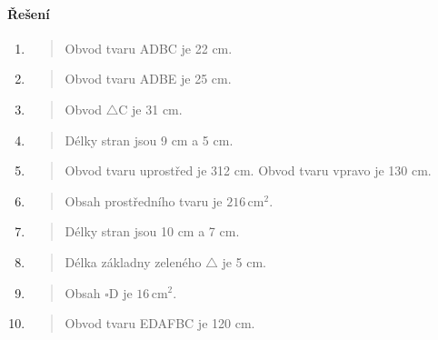 \paragraph{Řešení}
\begin{enumerate}
    \item
    \begin{quote}
        Obvod tvaru ADBC je 22 cm.
    \end{quote}

    \item
    \begin{quote}
        Obvod tvaru ADBE je 25 cm.
    \end{quote}

    \item
    \begin{quote}
        Obvod $\triangle$C je 31 cm.
    \end{quote}

    \item
    \begin{quote}
        Délky stran jsou 9 cm a 5 cm.
    \end{quote}

    \item
    \begin{quote}
        Obvod tvaru uprostřed je 312 cm.
        Obvod tvaru vpravo je 130 cm.
    \end{quote}

    \item
    \begin{quote}
        Obsah prostředního tvaru je $216\,\text{cm}^{2}$.
    \end{quote}

    \item
    \begin{quote}
        Délky stran jsou 10 cm a 7 cm.
    \end{quote}

    \item
    \begin{quote}
        Délka základny zeleného $\triangle$ je 5 cm.
    \end{quote}

    \item
    \begin{quote}
        Obsah $\square$D je $16\,\text{cm}^{2}$.
    \end{quote}

    \item
    \begin{quote}
        Obvod tvaru EDAFBC je 120 cm.
    \end{quote}
\end{enumerate}

